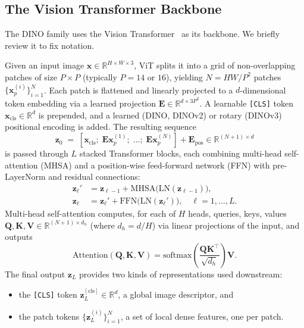 \documentclass[11pt,a4paper]{article}
\newcommand{\R}{\mathbb{R}}
\newcommand{\softmax}{\mathrm{softmax}}
\newcommand{\vect}[1]{\mathbf{#1}}
\newcommand{\trans}{^{\top}}
\begin{document}
\subsection{The Vision Transformer Backbone}
\label{sec:vit}

The DINO family uses the Vision Transformer~\citep{dosovitskiy2021image}
as its backbone. We briefly review it to fix notation.

Given an input image $\vect{x} \in \R^{H \times W \times 3}$, ViT splits it
into a grid of non-overlapping patches of size $P \times P$ (typically
$P = 14$ or $16$), yielding $N = HW/P^{2}$ patches
$\{\vect{x}_{p}^{(i)}\}_{i=1}^{N}$. Each patch is flattened and linearly
projected to a $d$-dimensional token embedding via a learned projection
$\vect{E} \in \R^{d \times 3P^{2}}$. A learnable \texttt{[CLS]} token
$\vect{x}_{\text{cls}} \in \R^{d}$ is prepended, and a learned (DINO, DINOv2)
or rotary (DINOv3) positional encoding is added. The resulting sequence
\begin{equation}
\vect{z}_{0} \;=\; [\vect{x}_{\text{cls}};\;\vect{E}\vect{x}_{p}^{(1)};\;\ldots;\;\vect{E}\vect{x}_{p}^{(N)}] + \vect{E}_{\text{pos}}
\in \R^{(N+1)\times d}
\end{equation}
is passed through $L$ stacked Transformer blocks, each combining multi-head
self-attention (MHSA) and a position-wise feed-forward network (FFN) with
pre-LayerNorm and residual connections:
\begin{align}
\vect{z}_{\ell}' &= \vect{z}_{\ell-1} + \mathrm{MHSA}\bigl(\mathrm{LN}(\vect{z}_{\ell-1})\bigr), \\
\vect{z}_{\ell}  &= \vect{z}_{\ell}'   + \mathrm{FFN}\bigl(\mathrm{LN}(\vect{z}_{\ell}')\bigr), \quad \ell = 1,\ldots,L.
\end{align}
Multi-head self-attention computes, for each of $H$ heads,
queries, keys, values $\vect{Q},\vect{K},\vect{V} \in \R^{(N+1)\times d_{h}}$
(where $d_{h}=d/H$) via linear projections of the input, and outputs
\begin{equation}
\mathrm{Attention}(\vect{Q},\vect{K},\vect{V}) =
\softmax\!\left(\frac{\vect{Q}\vect{K}\trans}{\sqrt{d_{h}}}\right)\vect{V}.
\end{equation}
The final output $\vect{z}_{L}$ provides two kinds of representations
used downstream:
\begin{itemize}[leftmargin=*]
  \item the \texttt{[CLS]} token $\vect{z}_{L}^{[\text{cls}]} \in \R^{d}$, a
  global image descriptor, and
  \item the patch tokens $\{\vect{z}_{L}^{(i)}\}_{i=1}^{N}$, a set of local
  dense features, one per patch.
\end{itemize}
\end{document}

